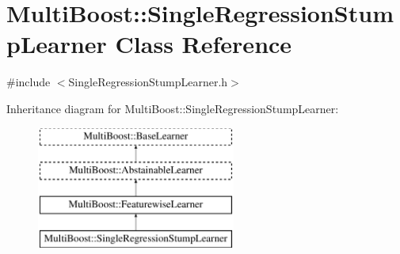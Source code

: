\hypertarget{classMultiBoost_1_1SingleRegressionStumpLearner}{
\section{MultiBoost::SingleRegressionStumpLearner Class Reference}
\label{classMultiBoost_1_1SingleRegressionStumpLearner}
}


{\ttfamily \#include $<$SingleRegressionStumpLearner.h$>$}

Inheritance diagram for MultiBoost::SingleRegressionStumpLearner:\begin{figure}[H]
\begin{center}
\leavevmode
\includegraphics[height=4.000000cm]{classMultiBoost_1_1SingleRegressionStumpLearner}
\end{center}
\end{figure}
